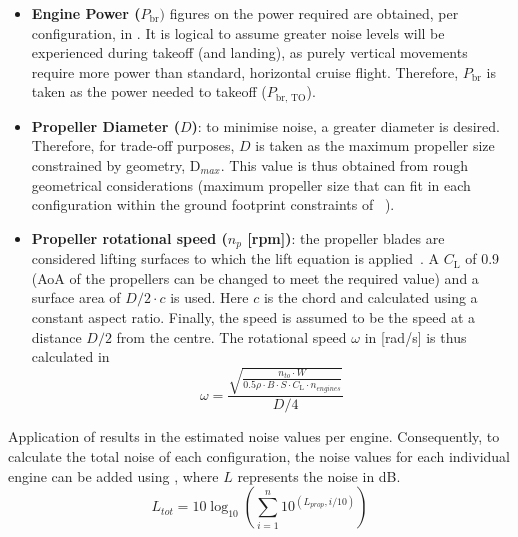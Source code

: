 \begin{itemize}
    \item \textbf{Engine Power ($P_{\text{br}})$} figures on the power required are obtained, per configuration, in .
    It is logical to assume greater noise levels will be experienced during takeoff (and landing), as purely vertical movements require more power than standard, horizontal cruise flight.
    Therefore, $P_{\text{br}}$ is taken as the power needed to takeoff ($P_{\text{br, TO}}$).

    \item \textbf{Propeller Diameter ($D$)}: to minimise noise, a greater diameter is desired.
    Therefore, for trade-off purposes, $D$ is taken as the maximum propeller size constrained by geometry, D$_{max}$.
    This value is thus obtained from rough geometrical considerations (maximum propeller size that can fit in each configuration within the ground footprint constraints of ~\cite{baselinerepo}).

    \item \textbf{Propeller rotational speed ($n_p$ [rpm])}: the propeller blades are considered lifting surfaces to which the lift equation is applied~\cite{HelicopterFlight}.
    A $C_{\text{L}}$ of 0.9 (AoA of the propellers can be changed to meet the required value) and a surface area of $D/2 \cdot c$ is used.
    Here $c$ is the chord and calculated using a constant aspect ratio.
    Finally, the speed is assumed to be the speed at a distance $D/2$ from the centre.
    The rotational speed $\omega$ in [rad/s] is thus calculated in 
    \begin{equation}
    \label{eq:omegaBSAss}
    \omega=\frac{\sqrt{\frac{n_{to} \cdot W}{0.5 \rho \cdot B\cdot S \cdot C_{\text{L}} \cdot n_{engines}}}}{D/4}
    \end{equation}
    
    
\end{itemize}
Application of  results in the estimated noise values per engine.
Consequently, to calculate the total noise of
each configuration, the noise values for each individual engine can be added using , where $L$ represents the noise in dB.
\begin{equation}
\label{eq:totalnoise}
    L_{t o t}=10 \log _{10}\left(\sum_{i=1}^n 10^{\left(L_{p r o p}, i / 10\right)}\right)
\end{equation}



























